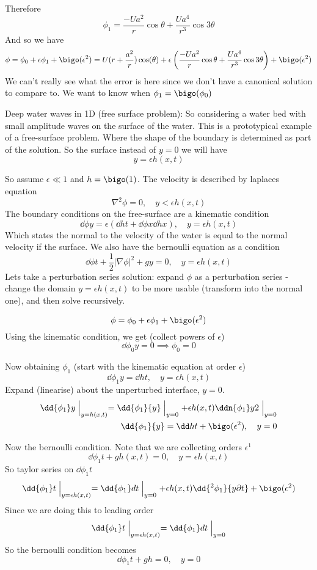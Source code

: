 \documentclass{X:/Documents/Coding/Latex/myassignment}
\begin{document}
Therefore
\[\phi_1 = \frac{-Ua^2}{r} \cos\theta + \frac{Ua^4}{r^3} \cos3\theta\]
And so we have
\[\phi = \phi_0 + \epsilon\phi_1 + \bigo(\epsilon^2)=  U(r + \frac{a^2}{r})\cos(\theta) + \epsilon\left(\frac{-Ua^2}{r} \cos\theta + \frac{Ua^4}{r^3} \cos3\theta\right)+ \bigo(\epsilon^2)\]
We can't really see what the error is here since we don't have a canonical solution to compare to. 
We want to know when $\phi_1 = \bigo(\phi_0)$



Deep water waves in 1D (free surface problem):
So considering a water bed with small amplitude waves on the surface of the water. This is a prototypical example of a free-surface problem. Where the shape of the boundary is determined as part of the solution. 
So the surface instead of $y=0$ we will have
\[y = \epsilon h(x,t)\]

So assume $\epsilon \ll 1$ and $h = \bigo(1)$. The velocity is described by laplaces equation
\[\nabla^2 \phi = 0, \quad y < \epsilon h(x,t)\]
The boundary conditions on the free-surface are a kinematic condition
\[\dd\phi y = \epsilon\left(\dd ht + \dd\phi x \dd hx\right),\quad y=\epsilon h(x,t)\]
Which states the normal to the velocity of the water is equal to the normal velocity if the surface. We also have the bernoulli equation as a condition
\[\dd\phi t + \frac12 |\nabla \phi|^2 + gy = 0,\quad y=\epsilon h(x,t)\]
Lets take a perturbation series solution: expand $\phi$ as a perturbation series - change the domain $y = \epsilon h(x,t)$ to be more usable (transform into the normal one), and then solve recursively.

\[\phi = \phi_0 + \epsilon \phi_1 + \bigo(\epsilon^2)\]
Using the kinematic condition, we get (collect powers of $\epsilon$)
\[\dd{\phi_0}{y} = 0 \implies \phi_0 = 0\]

Now obtaining $\phi_1$ (start with the kinematic equation at order $\epsilon$)
\[\dd{\phi_1}{y} = \dd ht, \quad y = \epsilon h(x,t)\]
Expand (linearise) about the unperturbed interface, $y=0$.
\begin{align*}
    \dd{\phi_1}y \Bigm|_{y=h(x,t)} = \dd{\phi_1}{y}\Bigm|_{y=0} + \epsilon h(x,t) \ddn{\phi_1}y2\Bigm|_{y=0}\\
    \dd{\phi_1}{y} = \dd ht + \bigo(\epsilon^2),\quad y=0
\end{align*}

Now the bernoulli condition. Note that we are collecting orders $\epsilon^1$
\[\dd{\phi_1}t + gh(x,t) =0,\quad y = \epsilon h(x,t) \]
So taylor series on $\dd{\phi_1}t$
\[\dd{\phi_1}t\Bigm|_{y=\epsilon h(x,t)} = \dd{\phi_1}dt\Bigm|_{y=0} + \epsilon h(x,t) \dd{^2\phi_1}{y\partial t} + \bigo(\epsilon^2)\]
Since we are doing this to leading order
\[\dd{\phi_1}t\Bigm|_{y=\epsilon h(x,t)} = \dd{\phi_1}dt\Bigm|_{y=0}\]
So the bernoulli condition becomes
\[\dd{\phi_1}{t} + gh = 0 ,\quad y=0\]
\end{document}
